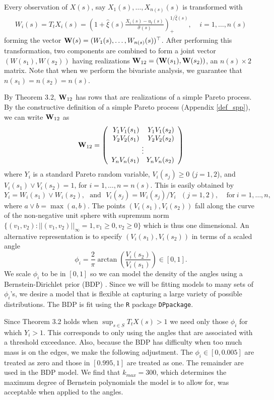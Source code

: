 Every observation of $X(s)$, say $X_1(s),\ldots,X_{n(s)}(s)$ is transformed with
\begin{align}
W_i(s) = T_t X_i(s) = \left(1 + \hat{\xi}(s) \frac{X_i(s) - u_t(s)}{\hat{\sigma}(s)}\right)_+^{1/\hat{\xi}(s)},~~~~~i=1,\ldots,n(s) \label{transform}
\end{align}
forming the vector $\mathbf{\bm{W}}(s)=(W_1(s),\ldots,W_{n(s)}(s))^\top$. After performing this transformation, two components are combined to form a joint vector $(W(s_1), W(s_2))$ having realizations $\mathbf{\bm{W}}_{12}=(\mathbf{\bm{W}}(s_1), \mathbf{\bm{W}}(s_2))$, an $n(s)\times 2$ matrix. Note that when we perform the bivariate analysis, we guarantee that $n(s_1)=n(s_2)=n(s)$.

By Theorem 3.2, $\mathbf{\bm{W}}_{12}$ has rows that are realizations of a simple Pareto process. By the constructive definition of a simple Pareto process (Appendix \ref{def_spp}), we can write $\mathbf{\bm{W}}_{12}$ as
\[ \m{W}_{12} = \left(\begin{array}{rr} Y_1V_1(s_1) & Y_1V_1(s_2) \\ Y_2V_2(s_1) & Y_2V_2(s_2) \\ \multicolumn{2}{c}{\vdots} \\ Y_nV_n(s_1) & Y_nV_n(s_2) \end{array}\right) \]
where $Y_i$ is a standard Pareto random variable, $V_i(s_j)\geq 0$ ($j=1,2$), and $V_i(s_1) \vee V_i(s_2) = 1$, for $i=1,\ldots,n=n(s)$. This is easily obtained by
\[ Y_i = W_i(s_1) \vee W_i(s_2),~~~\mathrm{and}~~~ V_i(s_j) = W_i(s_j) / Y_i ~~~ (j=1,2),~~~~~\mathrm{for~}i=1,\ldots,n, \]
where $a \vee b=\max(a,b)$. The points $(V_i(s_1), V_i(s_2))$ fall along the curve of the non-negative unit sphere with supremum norm $\{(v_1, v_2):||(v_1,v_2)||_\infty=1, v_1\geq0,v_2\geq0\}$ which is thus one dimensional. An alternative representation is to specify $(V_i(s_1), V_i(s_2))$ in terms of a scaled angle
\[ \phi_i = \frac{2}{\pi}\arctan\left(\frac{V_i(s_2)}{V_i(s_1)}\right)\in[0,1]. \]
We scale $\phi_i$ to be in $[0,1]$ so we can model the density of the angles using a Bernstein-Dirichlet prior (BDP) \citep{petrone1999bayesian}. Since we will be fitting models to many sets of $\phi_i$'s, we desire a model that is flexible at capturing a large variety of possible distributions. The BDP is fit using the \texttt{R} package \texttt{DPpackage}.

Since Theorem 3.2 holds when $\sup_{s\in S}T_t X(s) > 1$ we need only those $\phi_i$ for which $Y_i>1$. This corresponds to only using the angles that are associated with a threshold exceedance. Also, because the BDP has difficulty when too much mass is on the edges, we make the following adjustment. The $\phi_i\in[0, 0.005]$ are treated as zero and those in $[0.995, 1]$ are treated as one. The remainder are used in the BDP model. We find that $k_{max}=300$, which determines the maximum degree of Bernstein polynomials the model is to allow for, was acceptable when applied to the angles.



